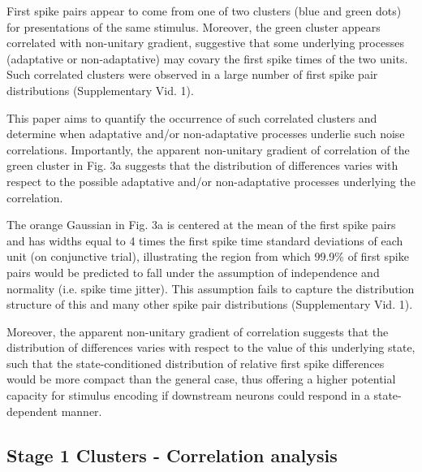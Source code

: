 \documentclass{article}
\begin{document}
First spike pairs appear to come from one of two clusters (blue and green dots) for presentations of the same stimulus. Moreover, the green cluster appears correlated with non-unitary gradient, suggestive that some underlying processes (adaptative or non-adaptative) may covary the first spike times of the two units. Such correlated clusters were observed in a large number of first spike pair distributions (Supplementary Vid. 1). 

This paper aims to quantify the occurrence of such correlated clusters and determine when adaptative and/or non-adaptative processes underlie such noise correlations. Importantly, the apparent non-unitary gradient of correlation of the green cluster in Fig. 3a suggests that the distribution of differences varies with respect to the possible adaptative and/or non-adaptative processes underlying the correlation.



The orange Gaussian in Fig. 3a is centered at the mean of the first spike pairs and has widths equal to 4 times the first spike time standard deviations of each unit (on conjunctive trial), illustrating the region from which 99.9\% of first spike pairs would be predicted to fall under the assumption of independence and normality (i.e. spike time jitter). This assumption fails to capture the distribution structure of this and many other spike pair distributions (Supplementary Vid. 1). 


Moreover, the apparent non-unitary gradient of correlation suggests that the distribution of differences varies with respect to the value of this underlying state, such that the state-conditioned distribution of relative first spike differences would be more compact than the general case, thus offering a higher potential capacity for stimulus encoding if downstream neurons could respond in a state-dependent manner.




\subsection*{Stage 1 Clusters - Correlation analysis}
\end{document}
